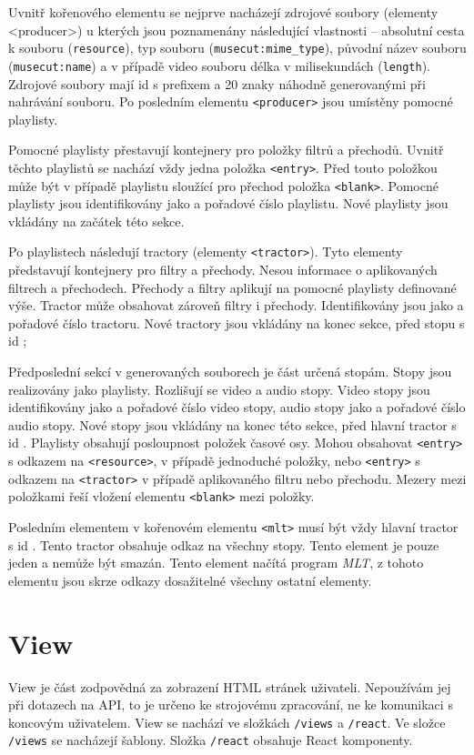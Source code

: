 Uvnitř kořenového elementu se nejprve  nacházejí zdrojové soubory (elementy <producer>) u kterých jsou poznamenány následující vlastnosti -- absolutní cesta k souboru (\texttt{resource}), typ souboru (\texttt{musecut:mime\_type}), původní název souboru (\texttt{musecut:name}) a v případě video souboru délka v milisekundách (\texttt{length}). Zdrojové soubory mají id s prefixem  a 20 znaky náhodně generovanými při nahrávání souboru.
Po posledním elementu \texttt{<producer>} jsou umístěny pomocné playlisty.

Pomocné playlisty přestavují kontejnery pro položky filtrů a přechodů. Uvnitř těchto playlistů se nachází vždy jedna položka \texttt{<entry>}. Před touto položkou může být v případě playlistu sloužící pro přechod položka \texttt{<blank>}. Pomocné playlisty jsou identifikovány jako  a pořadové číslo playlistu. Nové playlisty jsou vkládány na začátek této sekce.

Po playlistech následují tractory (elementy \texttt{<tractor>}). Tyto elementy představují kontejnery pro filtry a přechody. Nesou informace o aplikovaných filtrech a přechodech. Přechody a filtry aplikují na pomocné playlisty definované výše. Tractor může obsahovat zároveň filtry i přechody. Identifikovány jsou jako  a pořadové číslo tractoru. Nové tractory jsou vkládány na konec sekce, před stopu s id ;

Předposlední sekcí v generovaných souborech je část určená stopám. Stopy jsou realizovány jako playlisty. Rozlišují se video a audio stopy. Video stopy jsou identifikovány jako  a pořadové číslo video stopy, audio stopy jako  a pořadové číslo audio stopy. Nové stopy jsou vkládány na konec této sekce, před hlavní tractor s id . Playlisty obsahují posloupnost položek časové osy. Mohou obsahovat \texttt{<entry>} s odkazem na \texttt{<resource>}, v případě jednoduché položky, nebo \texttt{<entry>} s odkazem na \texttt{<tractor>} v případě aplikovaného filtru nebo přechodu. Mezery mezi položkami řeší vložení elementu \texttt{<blank>} mezi položky.

Posledním elementem v kořenovém elementu \texttt{<mlt>} musí být vždy hlavní tractor s id . Tento tractor obsahuje odkaz na všechny stopy. Tento element je pouze jeden a nemůže být smazán. Tento element načítá program \textit{MLT}, z tohoto elementu jsou skrze odkazy dosažitelné všechny ostatní elementy.

\section{View}
View je část zodpovědná za zobrazení HTML stránek uživateli. Nepoužívám jej při dotazech na API, to je určeno ke strojovému zpracování, ne ke komunikaci s koncovým uživatelem. View se nachází ve složkách \texttt{/views} a \texttt{/react}. Ve složce \texttt{/views} se nacházejí šablony. Složka \texttt{/react} obsahuje React komponenty.

